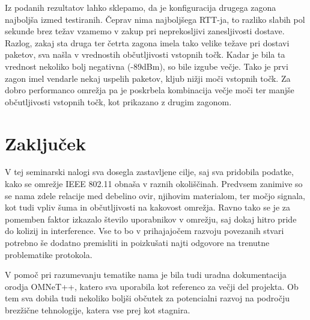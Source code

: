 \documentclass[11pt,a4paper,slovene]{myarticle}
\begin{document}
Iz podanih rezultatov lahko sklepamo, da je konfiguracija drugega zagona najboljša izmed testiranih. Čeprav nima najboljšega RTT-ja, to razliko slabih pol sekunde brez težav vzamemo v zakup pri neprekosljivi zanesljivosti dostave.
Razlog, zakaj sta druga ter četrta zagona imela tako velike težave pri dostavi paketov, sva našla v vrednostih občutljivosti vstopnih točk. Kadar je bila ta vrednost nekoliko bolj negativna (-89dBm), so bile izgube večje. Tako je prvi zagon imel vendarle nekaj uspelih paketov, kljub nižji moči vstopnih točk. Za dobro performanco omrežja pa je poskrbela kombinacija večje moči ter manjše občutljivosti vstopnih točk, kot prikazano z drugim zagonom.

\section{Zaključek}
V tej seminarski nalogi sva dosegla zastavljene cilje, saj sva pridobila podatke, kako se omrežje IEEE 802.11 obnaša v raznih okoliščinah. Predvsem zanimive so se nama zdele relacije med debelino ovir, njihovim materialom, ter močjo signala, kot tudi vpliv šuma in občutljivosti na kakovost omrežja. Ravno tako se je za pomemben faktor izkazalo število uporabnikov v omrežju, saj dokaj hitro pride do kolizij in interference. Vse to bo v prihajajočem razvoju povezanih stvari potrebno še dodatno premisliti in poizkušati najti odgovore na trenutne problematike protokola.

V pomoč pri razumevanju tematike nama je bila tudi uradna dokumentacija orodja OMNeT++\cite{omnetpp}, katero sva uporabila kot referenco za večji del projekta. Ob tem sva dobila tudi nekoliko boljši občutek za potencialni razvoj na področju brezžične tehnologije, katera vse prej kot stagnira\cite{wiki-802.11}.

\pagebreak


\end{document}

